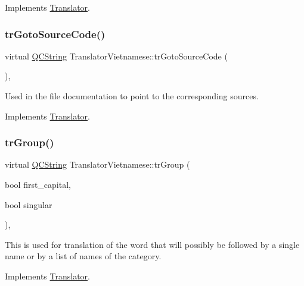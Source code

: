 Implements \mbox{\hyperlink{class_translator}{Translator}}.

\mbox{\label{class_translator_vietnamese_a312c0c4ab8f55f0e6b39c5b036c80442}} 
\subsubsection{\texorpdfstring{trGotoSourceCode()}{trGotoSourceCode()}}
{\footnotesize\ttfamily virtual \mbox{\hyperlink{class_q_c_string}{Q\+C\+String}} Translator\+Vietnamese\+::tr\+Goto\+Source\+Code (\begin{DoxyParamCaption}{ }\end{DoxyParamCaption})\hspace{0.3cm}{\ttfamily [inline]}, {\ttfamily [virtual]}}

Used in the file documentation to point to the corresponding sources. 

Implements \mbox{\hyperlink{class_translator}{Translator}}.

\mbox{\label{class_translator_vietnamese_a175bf730718a663492d4a1fab71b3101}} 
\subsubsection{\texorpdfstring{trGroup()}{trGroup()}}
{\footnotesize\ttfamily virtual \mbox{\hyperlink{class_q_c_string}{Q\+C\+String}} Translator\+Vietnamese\+::tr\+Group (\begin{DoxyParamCaption}\item[{bool}]{first\+\_\+capital,  }\item[{bool}]{singular }\end{DoxyParamCaption})\hspace{0.3cm}{\ttfamily [inline]}, {\ttfamily [virtual]}}

This is used for translation of the word that will possibly be followed by a single name or by a list of names of the category. 

Implements \mbox{\hyperlink{class_translator}{Translator}}.

\mbox{\label{class_translator_vietnamese_a4a91a2919eb1a4122ef6ecf8a76c722b}} 
